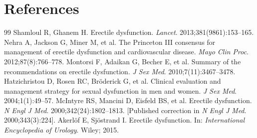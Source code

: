 \section*{References}
\begin{thebibliography}{99}
Shamloul R, Ghanem H. Erectile dysfunction. \textit{Lancet}. 2013;381(9861):153--165.
Nehra A, Jackson G, Miner M, et al. The Princeton III consensus for management of erectile dysfunction and cardiovascular disease. \textit{Mayo Clin Proc}. 2012;87(8):766--778.
Montorsi F, Adaikan G, Becher E, et al. Summary of the recommendations on erectile dysfunction. \textit{J Sex Med}. 2010;7(11):3467--3478.
Hatzichristou D, Rosen RC, Br\"{o}derick G, et al. Clinical evaluation and management strategy for sexual dysfunction in men and women. \textit{J Sex Med}. 2004;1(1):49--57.
McIntyre RS, Mancini D, Eisfeld BS, et al. Erectile dysfunction. \textit{N Engl J Med}. 2000;342(24):1802--1813. [Published correction in \textit{N Engl J Med}. 2000;343(3):224].
Akerl\"{o}f E, Sj\"{o}strand I. Erectile dysfunction. In: \textit{International Encyclopedia of Urology}. Wiley; 2015.
\end{thebibliography}
